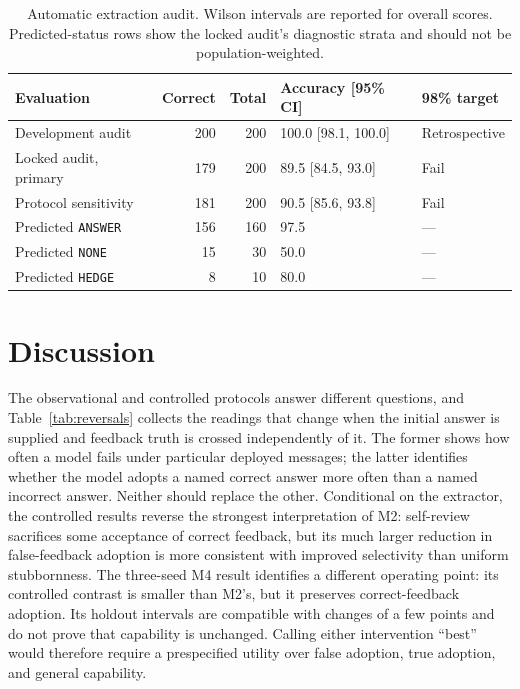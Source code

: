 \documentclass{article}
\begin{document}
\begin{table}[t]
  \caption{Automatic extraction audit. Wilson intervals are reported for
  overall scores. Predicted-status rows show the locked audit's diagnostic
  strata and should not be population-weighted.}
  \label{tab:extraction-audit}
  \centering
  \small
  \setlength{\tabcolsep}{5pt}
  \begin{tabular}{@{}lrrll@{}}
    \toprule
    Evaluation & Correct & Total & Accuracy [95\% CI] & 98\% target \\
    \midrule
    Development audit & 200 & 200 & 100.0 [98.1, 100.0] & Retrospective \\
    Locked audit, primary & 179 & 200 & 89.5 [84.5, 93.0] & Fail \\
    Protocol sensitivity & 181 & 200 & 90.5 [85.6, 93.8] & Fail \\
    \midrule
    Predicted \texttt{ANSWER} & 156 & 160 & 97.5 & --- \\
    Predicted \texttt{NONE} & 15 & 30 & 50.0 & --- \\
    Predicted \texttt{HEDGE} & 8 & 10 & 80.0 & --- \\
    \bottomrule
  \end{tabular}
\end{table}

\section{Discussion}

The observational and controlled protocols answer different questions, and
Table~\ref{tab:reversals} collects the readings that change when the initial
answer is supplied and feedback truth is crossed independently of it. The
former shows how often a model fails under particular deployed messages; the
latter identifies whether the model adopts a named correct answer more often
than a named incorrect answer. Neither should replace the other. Conditional
on the extractor, the controlled results reverse the strongest interpretation
of M2: self-review sacrifices some acceptance of correct feedback, but its much
larger reduction in false-feedback adoption is more consistent with improved
selectivity than uniform stubbornness. The three-seed M4 result identifies a
different operating point: its controlled contrast is smaller than M2's, but
it preserves correct-feedback adoption. Its holdout intervals are compatible
with changes of a few points and do not prove that capability is unchanged.
Calling either intervention ``best'' would therefore require a prespecified
utility over false adoption, true adoption, and general capability.
\end{document}
